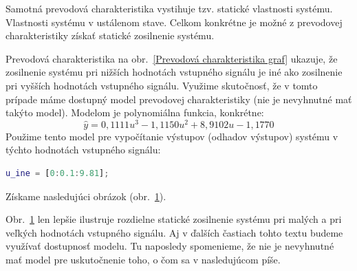 \documentclass[a4paper, 10pt, ]{article}
\begin{document}
Samotná prevodová charakteristika vystihuje tzv. statické vlastnosti systému. Vlastnosti systému v ustálenom stave. Celkom konkrétne je možné z prevodovej charakteristiky získať statické zosilnenie systému.

Prevodová charakteristika na obr.~\ref{Prevodová charakteristika graf} ukazuje, že zosilnenie systému pri nižších hodnotách vstupného signálu je iné ako zosilnenie pri vyšších hodnotách vstupného signálu. Využime skutočnosť, že v tomto prípade máme dostupný model prevodovej charakteristiky (nie je nevyhnutné mať takýto model). Modelom je polynomiálna funkcia, konkrétne:
\begin{equation} \label{modelPolifitVysl}
    \hat y = 0,1111 u^3  -1,1150 u^2 + 8,9102 u  -1,1770
\end{equation}
Použime tento model pre vypočítanie výstupov (odhadov výstupov) systému v týchto hodnotách vstupného signálu:
\begin{lstlisting}[language=Matlab,]
u_ine = [0:0.1:9.81];
\end{lstlisting}
Získame nasledujúci obrázok (obr.~\ref{Prevodová charakteristika graf2}).



Obr.~\ref{Prevodová charakteristika graf2} len lepšie ilustruje rozdielne statické zosilnenie systému pri malých a pri veľkých hodnotách vstupného signálu. Aj v ďalších častiach tohto textu budeme využívať dostupnosť modelu. Tu naposledy spomenieme, že nie je nevyhnutné mať model pre uskutočnenie toho, o čom sa v nasledujúcom píše.








\begin{figure}[t]
	\centering


    \vspace{-4mm}

	\caption{}
	\label{Prevodová charakteristika graf2}

\end{figure}
\end{document}
